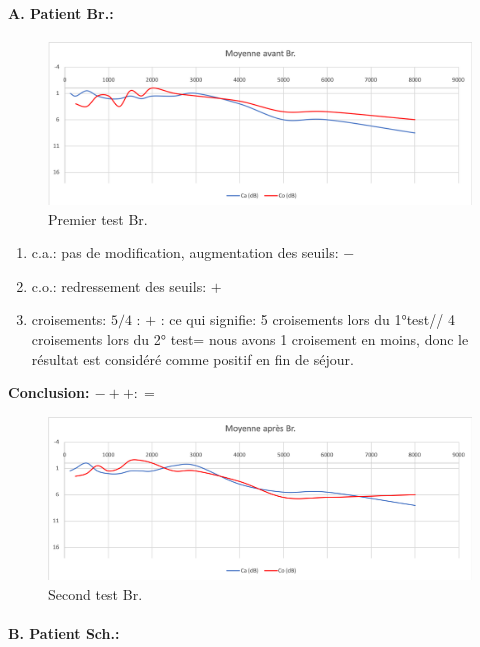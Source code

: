        
      \paragraph{ A. Patient Br.:}
  \begin{figure}[ht]
\centering
\includegraphics[width=0.7\linewidth]{images/graphiques/bru_pre.png}
\caption[Moyenne OG+OD]{Premier test Br.}
       
\label{groupecontroleimage1}
\end{figure}

	\begin{enumerate}
 		\item  c.a.: pas de modification, augmentation des
                  seuils: $-$
 		\item  c.o.: redressement des seuils: $+$
 		\item  croisements: $5/4$ : $+$ : ce qui signifie:  5 croisements lors du 1°test// 4 croisements lors du 2° test= nous avons 1 croisement en moins, donc le résultat est considéré comme positif en fin
                  de séjour.
                \end{enumerate}

             \textbf{Conclusion: $- + +   :  =$}
 \begin{figure}[th]
\centering
\includegraphics[width=0.7\linewidth]{images/graphiques/bru_post.png}
\caption[Moyenne OG+OD]{Second test Br.}
       
\label{groupecontroleimage1}
\end{figure}





\paragraph{B. Patient Sch.:}

